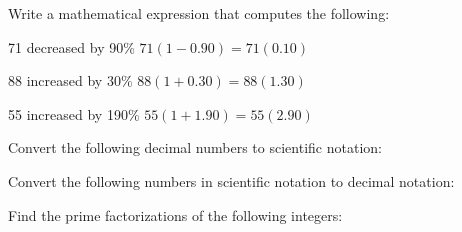 \documentclass[12pt,letterpaper]{exam}
\begin{document}
\begin{questions}
\question[6] Write a mathematical expression that computes the following: \pspace
\begin{parts}
\item 71 decreased by 90\% \hspace{2.7cm} $71(1 - 0.90)= 71(0.10)$ \vfill
\item 88 increased by 30\% \hspace{2.8cm} $88(1 + 0.30)= 88(1.30)$ \vfill
\item 55 increased by 190\% \hspace{2.5cm} $55(1 + 1.90)= 55(2.90)$ \vfill
\end{parts}



\newpage



\question[4] Convert the following decimal numbers to scientific notation: \pspace
{} \vfill



\question[4] Convert the following numbers in scientific notation to decimal notation: \pspace
{}



\newpage



\question[6] Find the prime factorizations of the following integers: \pspace
{}
\end{questions}
\end{document}
